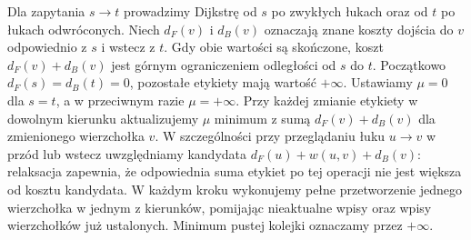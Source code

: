 Dla zapytania $s\to t$
prowadzimy Dijkstrę
od $s$ po zwykłych
łukach oraz od $t$
po łukach odwróconych.
Niech $d_F(v)$ i $d_B(v)$
oznaczają znane koszty
dojścia do $v$ odpowiednio
z $s$ i wstecz z $t$.
Gdy obie wartości są
skończone, koszt
$d_F(v)+d_B(v)$
jest górnym ograniczeniem
odległości od $s$ do $t$.
Początkowo $d_F(s)=d_B(t)=0$, pozostałe etykiety
mają wartość $+\infty$. Ustawiamy $\mu=0$ dla $s=t$,
a w przeciwnym razie $\mu=+\infty$.
Przy każdej zmianie etykiety w dowolnym kierunku
aktualizujemy $\mu$ minimum z sumą $d_F(v)+d_B(v)$
dla zmienionego wierzchołka $v$. W szczególności przy
przeglądaniu łuku $u\to v$ w przód lub wstecz uwzględniamy
kandydata $d_F(u)+w(u,v)+d_B(v)$: relaksacja zapewnia,
że odpowiednia suma etykiet po tej operacji nie jest
większa od kosztu kandydata.
W każdym kroku wykonujemy pełne przetworzenie jednego
wierzchołka w jednym z kierunków, pomijając nieaktualne
wpisy oraz wpisy wierzchołków już ustalonych.
Minimum pustej kolejki oznaczamy przez $+\infty$.

